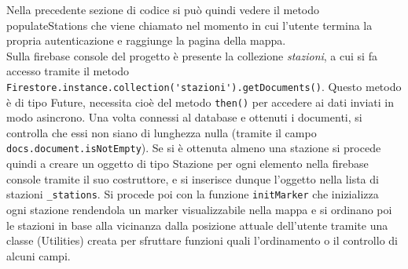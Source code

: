 Nella precedente sezione di codice si può quindi vedere il metodo populateStations che viene
chiamato nel momento in cui l'utente termina la propria autenticazione e
raggiunge la pagina della mappa. \\ Sulla firebase console del progetto è presente
la collezione \textit{stazioni}, a cui si fa accesso tramite il
metodo \verb|Firestore.instance.collection('stazioni').getDocuments()|. Questo
metodo è di tipo Future, 
necessita cioè del metodo \verb|then()| per accedere ai dati inviati in modo
asincrono. Una volta connessi al database e ottenuti i documenti, si controlla
che essi non siano di lunghezza nulla (tramite il campo
\verb|docs.document.isNotEmpty|). Se si è ottenuta almeno una stazione si
procede quindi a creare un oggetto di tipo Stazione per ogni elemento nella
firebase console tramite il suo costruttore, e si inserisce dunque l'oggetto
nella lista di stazioni \verb|_stations|. Si procede poi con la funzione
\verb|initMarker| che inizializza ogni stazione rendendola un marker
visualizzabile nella mappa e si ordinano poi le stazioni in base alla vicinanza
dalla posizione attuale dell'utente tramite una classe (Utilities) creata per
sfruttare funzioni quali l'ordinamento o il controllo di alcuni campi.

